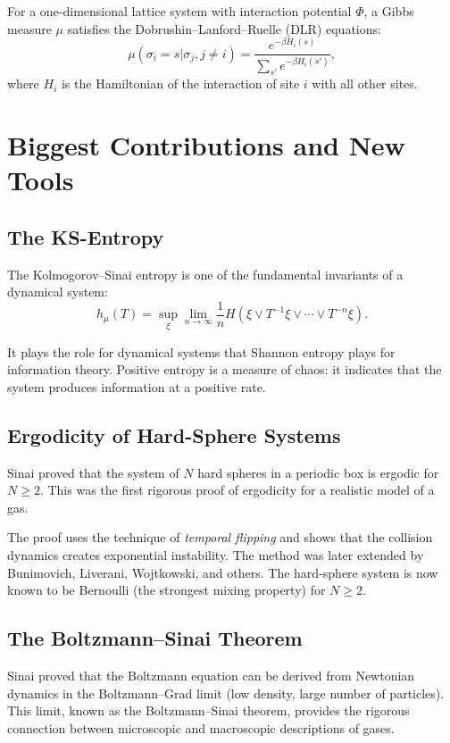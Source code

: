 For a one-dimensional lattice system with interaction potential $\Phi$, a Gibbs measure $\mu$ satisfies the Dobrushin--Lanford--Ruelle (DLR) equations:
\[
\mu(\sigma_i = s | \sigma_j, j \neq i) = \frac{e^{-\beta H_i(s)}}{\sum_{s'} e^{-\beta H_i(s')}},
\]
where $H_i$ is the Hamiltonian of the interaction of site $i$ with all other sites.

\section{Biggest Contributions and New Tools}

\subsection{The KS-Entropy}

The Kolmogorov--Sinai entropy is one of the fundamental invariants of a dynamical system:
\[
h_\mu(T) = \sup_{\xi} \lim_{n\to\infty} \frac{1}{n} H(\xi \vee T^{-1}\xi \vee \cdots \vee T^{-n}\xi).
\]

It plays the role for dynamical systems that Shannon entropy plays for information theory. Positive entropy is a measure of chaos: it indicates that the system produces information at a positive rate.

\subsection{Ergodicity of Hard-Sphere Systems}

Sinai proved that the system of $N$ hard spheres in a periodic box is ergodic for $N \geq 2$. This was the first rigorous proof of ergodicity for a realistic model of a gas.

The proof uses the technique of \emph{temporal flipping} and shows that the collision dynamics creates exponential instability. The method was later extended by Bunimovich, Liverani, Wojtkowski, and others. The hard-sphere system is now known to be Bernoulli (the strongest mixing property) for $N \geq 2$.

\subsection{The Boltzmann--Sinai Theorem}

Sinai proved that the Boltzmann equation can be derived from Newtonian dynamics in the Boltzmann--Grad limit (low density, large number of particles). This limit, known as the Boltzmann--Sinai theorem, provides the rigorous connection between microscopic and macroscopic descriptions of gases.

